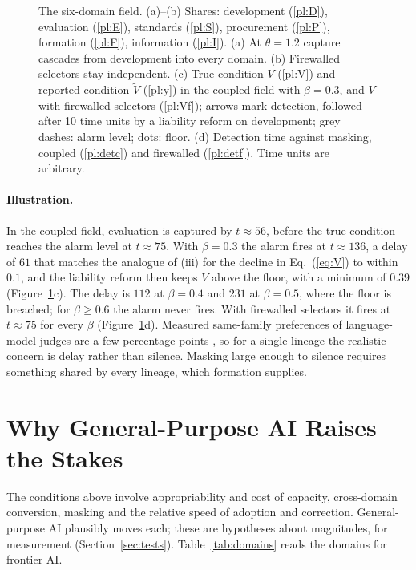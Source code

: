 \documentclass[letterpaper]{article} %
\theoremstyle{definition}
\begin{document}
\begin{figure}[t]
\centering

\caption{The six-domain field. (a)--(b) Shares: development (\ref{pl:D}), evaluation (\ref{pl:E}), standards (\ref{pl:S}), procurement (\ref{pl:P}), formation (\ref{pl:F}), information (\ref{pl:I}). (a) At $\theta=1.2$ capture cascades from development into every domain. (b) Firewalled selectors stay independent. (c) True condition $V$ (\ref{pl:V}) and reported condition $\tilde V$ (\ref{pl:y}) in the coupled field with $\beta=0.3$, and $V$ with firewalled selectors (\ref{pl:Vf}); arrows mark detection, followed after 10 time units by a liability reform on development; grey dashes: alarm level; dots: floor. (d) Detection time against masking, coupled (\ref{pl:detc}) and firewalled (\ref{pl:detf}). Time units are arbitrary.}
\label{fig:field}
\end{figure}

\paragraph{Illustration.} In the coupled field, evaluation is captured by $t\approx56$, before the true condition reaches the alarm level at $t\approx75$. With $\beta=0.3$ the alarm fires at $t\approx136$, a delay of $61$ that matches the analogue of (iii) for the decline in Eq.~(\ref{eq:V}) to within $0.1$, and the liability reform then keeps $V$ above the floor, with a minimum of $0.39$ (Figure~\ref{fig:field}c). The delay is $112$ at $\beta=0.4$ and $231$ at $\beta=0.5$, where the floor is breached; for $\beta\ge0.6$ the alarm never fires. With firewalled selectors it fires at $t\approx75$ for every $\beta$ (Figure~\ref{fig:field}d). Measured same-family preferences of language-model judges are a few percentage points \citep{awuni2026}, so for a single lineage the realistic concern is delay rather than silence. Masking large enough to silence requires something shared by every lineage, which formation supplies.

\section{Why General-Purpose AI Raises the Stakes}\label{sec:ai}

The conditions above involve appropriability and cost of capacity, cross-domain conversion, masking and the relative speed of adoption and correction. General-purpose AI plausibly moves each; these are hypotheses about magnitudes, for measurement (Section~\ref{sec:tests}). Table~\ref{tab:domains} reads the domains for frontier AI.
\end{document}
